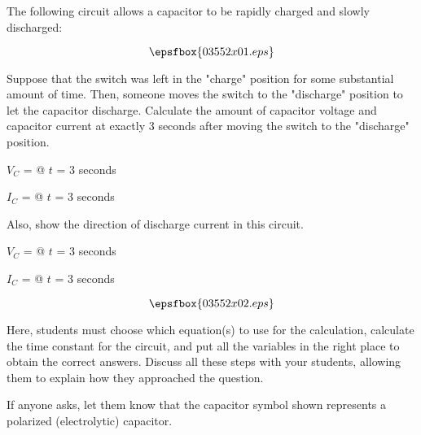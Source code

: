 

The following circuit allows a capacitor to be rapidly charged and slowly discharged:

$$\epsfbox{03552x01.eps}$$

Suppose that the switch was left in the "charge" position for some substantial amount of time.  Then, someone moves the switch to the "discharge" position to let the capacitor discharge.  Calculate the amount of capacitor voltage and capacitor current at exactly 3 seconds after moving the switch to the "discharge" position.

\vskip 10pt

$V_C$ = \underbar{\hskip 70pt} @ $t$ = 3 seconds

\vskip 10pt

$I_C$ = \underbar{\hskip 70pt} @ $t$ = 3 seconds

\vskip 10pt

Also, show the direction of discharge current in this circuit.







$V_C$ =  @ $t$ = 3 seconds

\vskip 10pt

$I_C$ =  @ $t$ = 3 seconds

$$\epsfbox{03552x02.eps}$$







Here, students must choose which equation(s) to use for the calculation, calculate the time constant for the circuit, and put all the variables in the right place to obtain the correct answers.  Discuss all these steps with your students, allowing them to explain how they approached the question.

If anyone asks, let them know that the capacitor symbol shown represents a polarized (electrolytic) capacitor.




